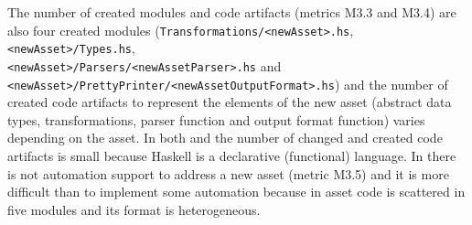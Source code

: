 The number of created modules and code artifacts (metrics M3.3 and M3.4) are also four created modules (\texttt{Transformations/<newAsset>.hs}, \texttt{<newAsset>/Types.hs}, \\ \texttt{<newAsset>/Parsers/<newAssetParser>.hs} and \\  \texttt{<newAsset>/PrettyPrinter/<newAssetOutputFormat>.hs}) and the number of created code artifacts to represent the elements of the new asset (abstract data types, transformations, parser function and output format function) varies depending on the asset.
In both \hpl{} and \hp{} the number of changed and created code artifacts is small because Haskell is a declarative (functional) language.
In \hp{} there is not automation support to address a new asset (metric M3.5) and it is more difficult than \hpl{} to implement some automation because in \hp{} asset code is scattered in five modules and its format is heterogeneous. 


